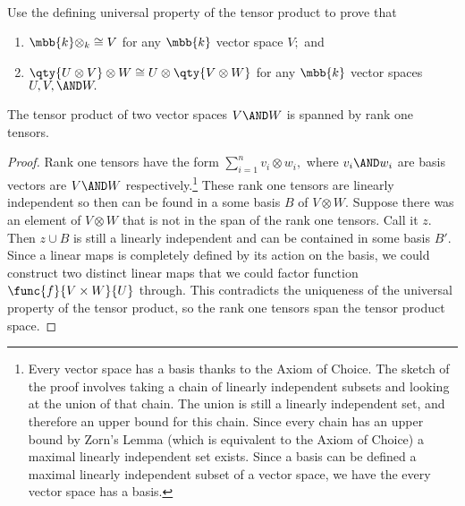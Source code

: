 \documentclass[../../main]{subfiles}
\begin{document}
\paragraph{}

\begin{exercise}Use the defining universal property of the tensor product
	to prove that 
	\begin{enumerate}
		\item $ \mbb{k}\otimes_k\cong V $ for any $ \mbb{k} $ vector space $ V; $ and
		\item $ \qty{U\otimes V}\otimes W\cong U\otimes\qty{V\otimes W} $ for any $ \mbb{k} $ vector spaces $ U,V,\AND W. $
	\end{enumerate}
\end{exercise}
\begin{lemma}
	The tensor product of two vector spaces $ V\AND W $ is spanned by rank one 
	tensors.
\end{lemma}
\begin{proof}
	Rank one tensors have the form $ \sum_{i=1}^n v_i\otimes w_i,$ where
	$ v_i\AND w_i $ are basis vectors are $ V\AND W$ 
	respectively.\footnote{Every vector space has a basis thanks to the Axiom 
	of Choice. The sketch of the proof involves taking a chain of linearly 
	independent subsets and looking at the union of that chain. The union is 
	still a linearly independent set, and therefore an upper bound for this
	chain. Since every chain has an upper bound by Zorn's Lemma (which is 
	equivalent to the Axiom of Choice) a maximal linearly independent set 
	exists. Since a basis can be defined a maximal linearly independent subset 
	of a vector space, we have the every vector space has a basis. }
	These rank one tensors are linearly independent so then can be found in a 
	some basis $ B $ of $ V\otimes W. $ Suppose there was an element of $ 
	V\otimes W $ that is not in	the span of the rank one tensors. Call it $ z. $
	Then $ z \cup B $ is still a linearly independent and can be contained in
	some basis $ B'. $ Since a linear maps is completely defined by its action
	on the basis, we could construct two distinct linear maps that we could 
	factor function $ \func{f}{V\times W}{U} $ through. This contradicts
	the uniqueness of the universal property of the tensor product,
	so the rank one tensors span the tensor product space. 

\end{proof}
	
\end{document}
